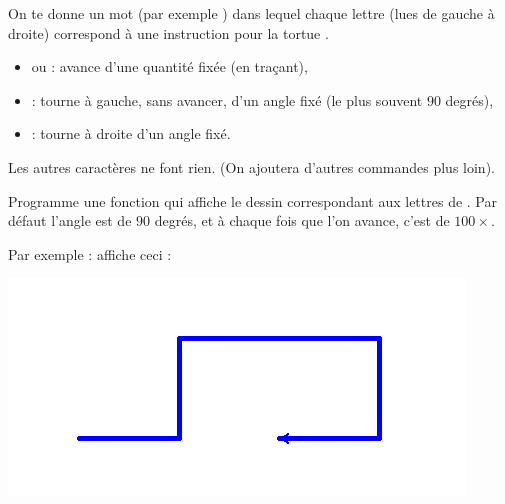\documentclass[11pt,class=report,crop=false]{standalone}
\begin{document}

\begin{activite}


On te donne un mot (par exemple ) dans lequel chaque lettre (lues de gauche à droite) correspond à une instruction pour la tortue \Python{}.

\begin{itemize}
  \item {} ou  : avance d'une quantité fixée (en traçant),
  \item {} : tourne à gauche, sans avancer, d'un angle fixé (le plus souvent $90$ degrés),
  \item {} : tourne à droite d'un angle fixé.
\end{itemize}

Les autres caractères ne font rien. (On ajoutera d'autres commandes plus loin).

Programme une fonction 
qui affiche le dessin correspondant aux lettres de . Par défaut l'angle est de $90$ degrés, et à chaque fois que l'on avance, c'est de $100 \times$.

Par exemple :  affiche ceci :
\begin{center}
\includegraphics[scale=\myscale,scale=0.6]{ecran-lsysteme-1}
\end{center}

\end{activite}


\end{document}

